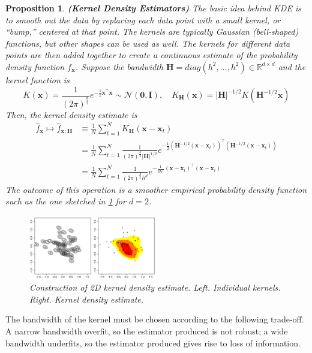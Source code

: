 \documentclass[13pt]{article}
\newtheorem{proposition}[theorem]{Proposition}
\theoremstyle{definition}
\theoremstyle{remark}
\newenvironment{remark}
  {\pushQED{\qed}\renewcommand{\qedsymbol}{$\triangle$}\remarkx}
  {\popQED\endremarkx}
\begin{document}
\begin{proposition}
    \textbf{(Kernel Density Estimators)} The basic idea behind KDE is to smooth out the data by replacing each data point with a small
kernel, or ``bump,” centered at that point. The kernels are typically Gaussian (bell-shaped) functions,
but other shapes can be used as well. The kernels for different data points are then added together
to create a continuous estimate of the probability density function $f_{\mathbf{x}}$. Suppose the bandwidth $\mathbf{H}=diag(h^2, \ldots, h^2)\in \mathbb{R}^{d\times d}$ and the kernel function is $$K(\mathbf{x})= \frac{1}{(2 \pi)^{\frac{d}{2}}} e^{-\frac{1}{2 }\mathbf{x}^{\top}\mathbf{x}}\sim \mathcal{N}(\bm{0}, \mathbf{I}), \quad K_{\mathbf{H}}(\mathbf{x})=|\mathbf{H}|^{-1 / 2} K\left(\mathbf{H}^{-1 / 2} \mathbf{x}\right)$$
Then, the kernel density estimate is 
\begin{align*}
\hat{f}_{\mathbf{x}} \mapsto \hat{f}_{\mathbf{x} ; \mathbf{H}} &\equiv  
\frac{1}{N} \sum_{t=1}^N K_{\mathbf{H}}\left( \mathbf{x}-\mathbf{x}_t\right)\\
&=\frac{1}{N} \sum_{t=1}^N \frac{1}{(2 \pi)^{\frac{d}{2}} |\mathbf{H}|^{1 / 2} } e^{-\frac{1}{2 }\left(\mathbf{H}^{-1 / 2} (\mathbf{x}-\mathbf{x}_t)\right)^{\top}\left(\mathbf{H}^{-1 / 2}(\mathbf{x}-\mathbf{x}_t)\right)}\\
&= \frac{1}{N} \sum_{t=1}^N \frac{1}{(2 \pi)^{\frac{d}{2}} h^d} e^{-\frac{1}{2 h^2}\left(\mathbf{x}-\mathbf{x}_t\right)^{\top}\left(\mathbf{x}-\mathbf{x}_t\right)}    
\end{align*}
The outcome of this operation is a smoother empirical probability density function such as the one sketched in \cref{fig:Synthetic_data_2D_KDE} for $d=2$.
\begin{figure}[!htp]
    \centering
    \includegraphics[width=0.5\textwidth]{Synthetic_data_2D_KDE.png}
    \caption{Construction of 2D kernel density estimate. Left. Individual kernels. Right. Kernel density estimate.}
    \label{fig:Synthetic_data_2D_KDE}
\end{figure}
\end{proposition}
\begin{remark}
        \item The bandwidth of the kernel must be chosen according to the following trade-off. A narrow bandwidth overfit, so the estimator produced is not robust; a wide bandwidth underfits, so the estimator produced gives rise to loss of information.
\end{remark}
\end{document}

